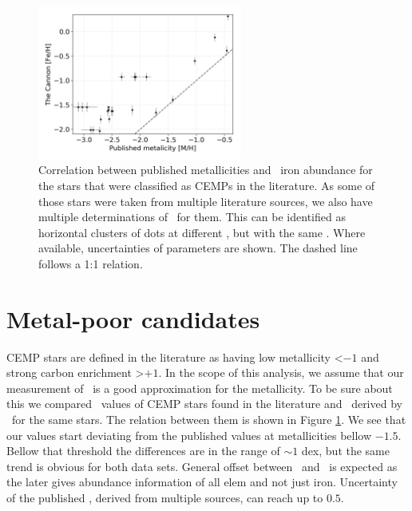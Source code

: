 \begin{figure}
	\centering
	\includegraphics[width=0.6\textwidth]{cemps_meh_feh.png}
	\caption{Correlation between published metallicities and \TC\ iron abundance for the stars that were classified as CEMPs in the literature. As some of those stars were taken from multiple literature sources, we also have multiple determinations of \Meh\ for them. This can be identified as horizontal clusters of dots at different \Meh, but with the same \Feh. Where available, uncertainties of parameters are shown. The dashed line follows a 1:1 relation.}
	\label{fig:cemps_feh}
\end{figure}

\section{Metal-poor candidates}
\label{sec:cemp_cemp}
CEMP stars are defined in the literature as having low metallicity \Meh \textless $-1$ and strong carbon enrichment \Cfe \textgreater $+1$. In the scope of this analysis, we assume that our measurement of \Feh\ is a good approximation for the metallicity. To be sure about this we compared \Meh\ values of CEMP stars found in the literature and \Feh\ derived by \TC\ for the same stars. The relation between them is shown in Figure \ref{fig:cemps_feh}. We see that our values start deviating from the published values at metallicities bellow $-1.5$. Bellow that threshold the differences are in the range of $\sim1$ dex, but the same trend is obvious for both data sets. General offset between \Feh\ and \Meh\ is expected as the later gives abundance information of all elem and not just iron. Uncertainty of the published \Meh, derived from multiple sources, can reach up to $0.5$. 

